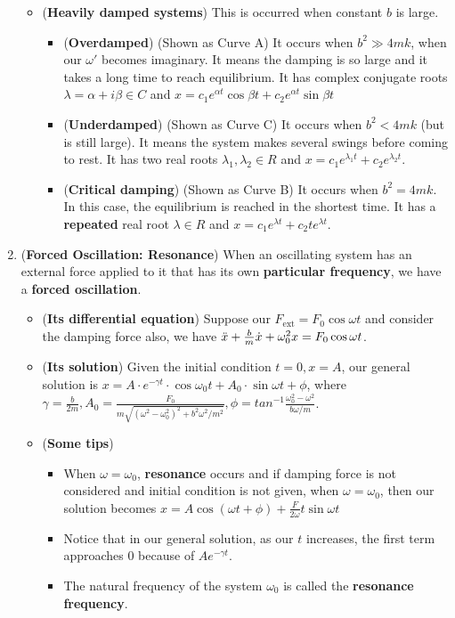 \documentclass[10pt, landscape]{article}
\begin{document}
\begin{multicols}{4}
\begin{enumerate}
\begin{itemize}
        \item (\textbf{Heavily damped systems}) This is occurred when constant $b$ is large.
        \begin{itemize}
            \item (\textbf{Overdamped}) (Shown as Curve A) It occurs when $b^2\gg 4mk$, when our $\omega'$ becomes imaginary. It means the damping is so large and it takes a long time to reach equilibrium. It has complex conjugate roots $\lambda=\alpha+i\beta \in C$ and $x=c_1e^{\alpha t}\cos\beta t+c_2e^{\alpha t}\sin\beta t$
            \item (\textbf{Underdamped}) (Shown as Curve C) It occurs when $b^2 < 4mk$ (but is still large). It means the system makes several swings before coming to rest. It has two real roots $\lambda_1, \lambda_2 \in R$ and $x=c_1e^{\lambda_1 t}+c_2e^{\lambda_2 t}$.
            \item (\textbf{Critical damping}) (Shown as Curve B) It occurs when $b^2=4mk$. In this case, the equilibrium is reached in the shortest time. It has a \textbf{repeated} real root $\lambda\in R$ and $x=c_1e^{\lambda t}+c_2te^{\lambda t}$.
        \end{itemize}
    \end{itemize}
  \item (\textbf{Forced Oscillation: Resonance}) When an oscillating system has an external force applied to it that has its own \textbf{particular frequency}, we have a \textbf{forced oscillation}.
    \begin{itemize}
        \item (\textbf{Its differential equation}) Suppose our $F_{\text{ext}}=F_0\cos\omega t$ and consider the damping force also, we have $\Ddot{x}+\frac{b}{m}\Dot{x}+\omega_0^2x=F_0\cos\omega t$.
        \item (\textbf{Its solution}) Given the initial condition $t=0, x=A$, our general solution is $x=A\cdot e^{-\gamma t}\cdot\cos\omega_0t+A_0\cdot\sin\omega t+\phi$, where $\gamma=\frac{b}{2m}, A_0=\frac{F_0}{m\sqrt{(\omega^2-\omega_0^2)^2+b^2\omega^2/m^2}}, \phi=tan^{-1}\frac{\omega_0^2-\omega^2}{b\omega/m}$.
        \item (\textbf{Some tips})
        \begin{itemize}
            \item When $\omega = \omega_0$, \textbf{resonance} occurs and if damping force is not considered and initial condition is not given, when $\omega = \omega_0$, then our solution becomes $x=A\cos(\omega t+\phi)+\frac{F}{2\omega}t\sin\omega t$
            \item Notice that in our general solution, as our $t$ increases, the first term approaches 0 because of $Ae^{-\gamma t}$.
            \item The natural frequency of the system $\omega_0$ is called the \textbf{resonance frequency}.
        \end{itemize}
    \end{itemize}
\end{enumerate}


\end{multicols}
\end{document}
